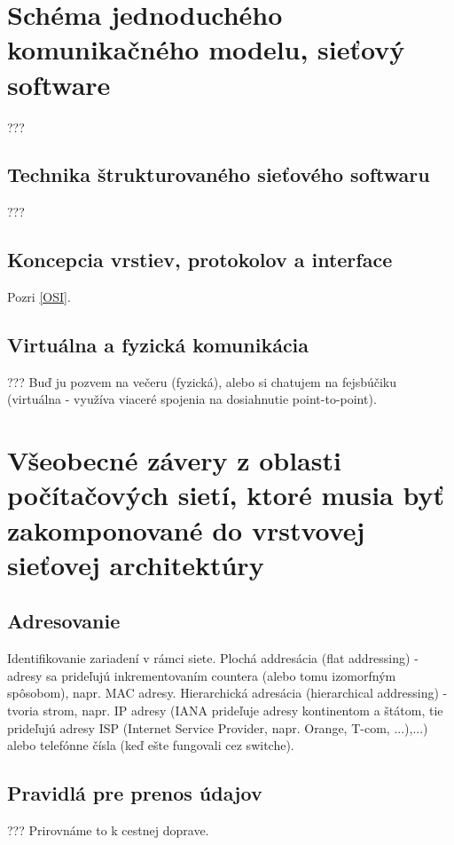 \documentclass[10pt,a4paper]{article}
\begin{document}
\section{Schéma jednoduchého komunikačného modelu, sieťový software} 
???

\subsection{Technika štrukturovaného sieťového softwaru} 
???
  
\subsection{Koncepcia vrstiev, protokolov a interface} 
Pozri \ref{OSI}. 

\subsection{Virtuálna a fyzická komunikácia}      
???
Buď ju pozvem na večeru (fyzická), alebo si chatujem na fejsbúčiku (virtuálna - využíva viaceré spojenia na dosiahnutie point-to-point). 
                            
\section{Všeobecné závery z oblasti počítačových sietí, ktoré musia byť zakomponované do vrstvovej sieťovej architektúry}   
\subsection{Adresovanie}    
Identifikovanie zariadení v rámci siete. Plochá addresácia (flat addressing) - adresy sa prideľujú inkrementovaním countera (alebo tomu izomorfným spôsobom), napr. MAC adresy.
Hierarchická adresácia (hierarchical addressing) - tvoria strom, napr. IP adresy (IANA prideľuje adresy kontinentom a štátom, tie prideľujú adresy ISP (Internet Service Provider, napr. Orange, T-com, ...),...) alebo telefónne čísla (keď ešte fungovali cez switche).
              
\subsection{Pravidlá pre prenos údajov}   
???
Prirovnáme to k cestnej doprave. 
\end{document}
